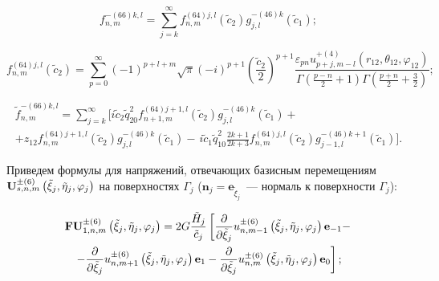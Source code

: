 \begin{equation}
f_{n,m}^{ - (66)k,l} = \sum\limits_{j = k}^\infty  {f_{n,m}^{(64)j,l}({{\tilde c}_2})g_{j,l}^{ - (46)k}} ({\tilde c_1});
\end{equation}

\begin{equation}
f_{n,m}^{(64)j,l}({\tilde c_2}) = \sum\limits_{p = 0}^\infty  {{{( - 1)}^{p + l + m}}} \sqrt \pi  {( - i)^{p + 1}}{\left( {\frac{{{{\tilde c}_2}}}{2}} \right)^{p + 1}}\frac{{{\varepsilon _{pn}}u_{p + j,m - l}^{ + (4)}\left( {{r_{12}},{\theta _{12}},{\varphi _{12}}} \right)}}{{\Gamma \left( {\frac{{p - n}}{2} + 1} \right)\Gamma \left( {\frac{{p + n}}{2} + \frac{3}{2}} \right)}};
\end{equation}

\begin{multline}
\tilde f_{n,m}^{ - (66)k,l} = \sum\limits_{j = k}^\infty\bigg[i{{\tilde c}_2}\tilde q_{20}^2f_{n + 1,m}^{(64)j + 1,l}({{\tilde c}_2})g_{j,l}^{ - (46)k}({{\tilde c}_1}) + \\
+ {z_{12}}f_{n,m}^{(64)j + 1,l}({{\tilde c}_2})g_{j,l}^{ - (46)k}({{\tilde c}_1}) - \frac{{}}{{}}i{{\tilde c}_1}\tilde q_{10}^2\frac{{2k + 1}}{{2k + 3}}f_{n,m}^{(64)j,l}({{\tilde c}_2})g_{j - 1,l}^{ - (46)k + 1}({{\tilde c}_1}) \bigg].
\end{multline}

Приведем формулы для напряжений, отвечающих базисным перемещениям ${\bf{U}}_{s,n,m}^{ \pm (6)}\left( {{{\tilde \xi }_j},{{\tilde \eta }_j},{\varphi _j}} \right)$ на поверхностях $\Gamma_j$ ($\mathbf{n}_j=\mathbf{e}_{\tilde\xi_j}$~--- нормаль к поверхности $\Gamma_j$):

\begin{multline}
{\bf{FU}}_{1,n,m}^{ \pm (6)}\left( {{{\tilde \xi }_j},{{\tilde \eta }_j},{\varphi _j}} \right) = 2G\frac{{{{\tilde H}_j}}}{{{{\tilde c}_j}}}\left[ {\frac{\partial }{{\partial {{\tilde \xi }_j}}}u_{n,m - 1}^{ \pm (6)}\left( {{{\tilde \xi }_j},{{\tilde \eta }_j},{\varphi _j}} \right){{\bf{e}}_{ - 1}} - } \right.\\
\left. { - \frac{\partial }{{\partial {{\tilde \xi }_j}}}u_{n,m + 1}^{ \pm (6)}\left( {{{\tilde \xi }_j},{{\tilde \eta }_j},{\varphi _j}} \right){{\bf{e}}_1} - \frac{\partial }{{\partial {{\tilde \xi }_j}}}u_{n,m}^{ \pm (6)}\left( {{{\tilde \xi }_j},{{\tilde \eta }_j},{\varphi _j}} \right){{\bf{e}}_0}} \right];
\label{eq:10:25o}
\end{multline}

